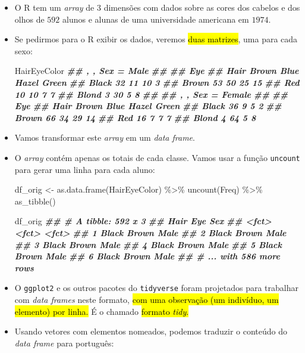 \documentclass[
  11pt]{report}
\newenvironment{Shaded}{\begin{snugshade}}{\end{snugshade}}
\newcommand{\DocumentationTok}[1]{\textcolor[rgb]{0.56,0.35,0.01}{\textbf{\textit{#1}}}}
\newcommand{\FunctionTok}[1]{\textcolor[rgb]{0.00,0.00,0.00}{#1}}
\newcommand{\NormalTok}[1]{#1}
\newcommand{\OtherTok}[1]{\textcolor[rgb]{0.56,0.35,0.01}{#1}}
\newcommand{\SpecialCharTok}[1]{\textcolor[rgb]{0.00,0.00,0.00}{#1}}
\renewenvironment{Shaded}{
    \begin{mdframed}[%
      roundcorner=2pt,%
      innerleftmargin=5pt,%
      innerrightmargin=5pt,%
      topline=true,%
      leftline=true,%
      rightline=true,%
      bottomline=true,%
      linewidth=0.5pt,%
      linecolor=black!20,%
      backgroundcolor=black!2,%
      skipabove=2ex,%
      skipbelow=2.5ex%
    ]%
  }
  {
    \end{mdframed}
  }
\begin{document}
\begin{itemize}
\item
  O R tem um \emph{array} de $3$ dimensões com dados sobre as cores dos cabelos e dos olhos de $592$ alunos e alunas de uma universidade americana em $1974$.
\item
  Se pedirmos para o R exibir os dados, veremos {\hl{duas matrizes}}, uma para cada sexo:

\begin{Shaded}
\begin{Highlighting}[]
\NormalTok{HairEyeColor}
\DocumentationTok{\#\# , , Sex = Male}
\DocumentationTok{\#\# }
\DocumentationTok{\#\#        Eye}
\DocumentationTok{\#\# Hair    Brown Blue Hazel Green}
\DocumentationTok{\#\#   Black    32   11    10     3}
\DocumentationTok{\#\#   Brown    53   50    25    15}
\DocumentationTok{\#\#   Red      10   10     7     7}
\DocumentationTok{\#\#   Blond     3   30     5     8}
\DocumentationTok{\#\# }
\DocumentationTok{\#\# , , Sex = Female}
\DocumentationTok{\#\# }
\DocumentationTok{\#\#        Eye}
\DocumentationTok{\#\# Hair    Brown Blue Hazel Green}
\DocumentationTok{\#\#   Black    36    9     5     2}
\DocumentationTok{\#\#   Brown    66   34    29    14}
\DocumentationTok{\#\#   Red      16    7     7     7}
\DocumentationTok{\#\#   Blond     4   64     5     8}
\end{Highlighting}
\end{Shaded}
\item
  Vamos transformar este \emph{array} em um \emph{data frame}.
\item
  O \emph{array} contém apenas os totais de cada classe. Vamos usar a função \texttt{uncount} para gerar uma linha para cada aluno:

\begin{Shaded}
\begin{Highlighting}[]
\NormalTok{df\_orig }\OtherTok{\textless{}{-}} \FunctionTok{as.data.frame}\NormalTok{(HairEyeColor) }\SpecialCharTok{\%\textgreater{}\%} 
  \FunctionTok{uncount}\NormalTok{(Freq) }\SpecialCharTok{\%\textgreater{}\%} 
  \FunctionTok{as\_tibble}\NormalTok{()}

\NormalTok{df\_orig}
\DocumentationTok{\#\# \# A tibble: 592 x 3}
\DocumentationTok{\#\#   Hair  Eye   Sex  }
\DocumentationTok{\#\#   \textless{}fct\textgreater{} \textless{}fct\textgreater{} \textless{}fct\textgreater{}}
\DocumentationTok{\#\# 1 Black Brown Male }
\DocumentationTok{\#\# 2 Black Brown Male }
\DocumentationTok{\#\# 3 Black Brown Male }
\DocumentationTok{\#\# 4 Black Brown Male }
\DocumentationTok{\#\# 5 Black Brown Male }
\DocumentationTok{\#\# 6 Black Brown Male }
\DocumentationTok{\#\# \# ... with 586 more rows}
\end{Highlighting}
\end{Shaded}
\item
  O \texttt{ggplot2} e os outros pacotes do \texttt{tidyverse} foram projetados para trabalhar com \emph{data frames} neste formato, {\hl{com uma observação (um indivíduo, um elemento) por linha.}} É o chamado {\hl{formato \emph{tidy}.}}
\item
  Usando vetores com elementos nomeados, podemos traduzir o conteúdo do \emph{data frame} para português:


\end{itemize}
\end{document}
